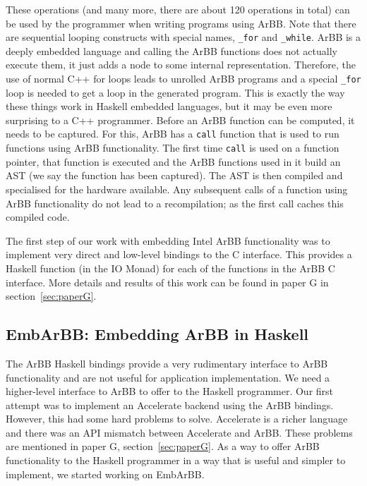 \documentclass[a4paper]{book}
\begin{document}
\noindent These operations (and many more, there are about 120 operations in total) can be used 
by the programmer when writing programs using ArBB. Note that there are sequential looping 
constructs with special names, {\tt \_for} and {\tt \_while}. ArBB is a deeply embedded 
language and calling the ArBB functions does not actually execute them, it just adds a node to 
some internal representation. Therefore, the use of normal C++ for loops leads to unrolled 
ArBB programs and a special {\tt \_for} loop is needed to get a loop in the generated program. 
This is exactly the way these things work in Haskell embedded languages, but it may be even 
more surprising to a C++ programmer. Before an ArBB function can be computed, it needs to be 
captured. For this, ArBB has a {\tt call} function that is used to run functions using ArBB 
functionality. The first time {\tt call} is used on a function pointer, that function is 
executed and the ArBB functions used in it build an AST (we say the function has been 
captured). The AST is then compiled and specialised for the hardware available. Any 
subsequent calls of a function using ArBB functionality do not lead to a recompilation; 
as the first call caches this compiled code. 

The first step of our work with embedding Intel ArBB functionality was to implement very direct 
and low-level bindings to the C interface. This provides a Haskell function (in the IO Monad) 
for each of the functions in the ArBB C interface. More details and results of this work 
can be found in paper G in section~\ref{sec:paperG}.



\subsection{EmbArBB: Embedding ArBB in Haskell}
\label{sec:EmbArBB} 

The ArBB Haskell bindings provide a very rudimentary interface to ArBB functionality and 
are not useful for application implementation. We need a higher-level interface to ArBB to offer 
to the Haskell programmer. Our first attempt was to implement an Accelerate backend 
using the ArBB bindings. However, this had some hard problems to solve. Accelerate is a 
richer language and there was an API mismatch between Accelerate and ArBB. These problems 
are mentioned in paper G, section~\ref{sec:paperG}. As a way to offer ArBB functionality 
to the Haskell programmer in a way that is useful and simpler to implement, we started 
working on EmbArBB. 
\end{document}
